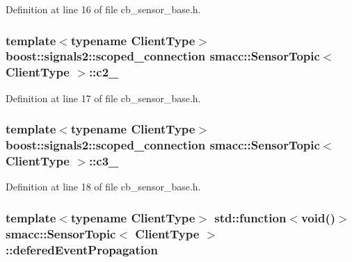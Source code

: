 Definition at line 16 of file cb\+\_\+sensor\+\_\+base.\+h.

\subsubsection[{\texorpdfstring{c2\+\_\+}{c2_}}]{\setlength{\rightskip}{0pt plus 5cm}template$<$typename Client\+Type$>$ boost\+::signals2\+::scoped\+\_\+connection {\bf smacc\+::\+Sensor\+Topic}$<$ Client\+Type $>$\+::c2\+\_\+}\hypertarget{classsmacc_1_1SensorTopic_a99fd05ee6d84ddeb4ffa7ef51ddc0567}{}\label{classsmacc_1_1SensorTopic_a99fd05ee6d84ddeb4ffa7ef51ddc0567}


Definition at line 17 of file cb\+\_\+sensor\+\_\+base.\+h.

\subsubsection[{\texorpdfstring{c3\+\_\+}{c3_}}]{\setlength{\rightskip}{0pt plus 5cm}template$<$typename Client\+Type$>$ boost\+::signals2\+::scoped\+\_\+connection {\bf smacc\+::\+Sensor\+Topic}$<$ Client\+Type $>$\+::c3\+\_\+}\hypertarget{classsmacc_1_1SensorTopic_ae95d0b3f4d9d419b6c4367265c002826}{}\label{classsmacc_1_1SensorTopic_ae95d0b3f4d9d419b6c4367265c002826}


Definition at line 18 of file cb\+\_\+sensor\+\_\+base.\+h.

\subsubsection[{\texorpdfstring{defered\+Event\+Propagation}{deferedEventPropagation}}]{\setlength{\rightskip}{0pt plus 5cm}template$<$typename Client\+Type$>$ std\+::function$<$void()$>$ {\bf smacc\+::\+Sensor\+Topic}$<$ Client\+Type $>$\+::defered\+Event\+Propagation}\hypertarget{classsmacc_1_1SensorTopic_ad9c462b8458e9b3c4b38404adbb5f067}{}\label{classsmacc_1_1SensorTopic_ad9c462b8458e9b3c4b38404adbb5f067}


